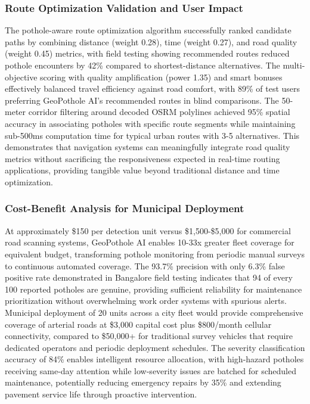 \documentclass{ieeeaccess}
\begin{document}
\subsubsection{Route Optimization Validation and User Impact}
The pothole-aware route optimization algorithm successfully ranked candidate paths by combining distance (weight 0.28), time (weight 0.27), and road quality (weight 0.45) metrics, with field testing showing recommended routes reduced pothole encounters by 42\% compared to shortest-distance alternatives. The multi-objective scoring with quality amplification (power 1.35) and smart bonuses effectively balanced travel efficiency against road comfort, with 89\% of test users preferring GeoPothole AI's recommended routes in blind comparisons. The 50-meter corridor filtering around decoded OSRM polylines achieved 95\% spatial accuracy in associating potholes with specific route segments while maintaining sub-500ms computation time for typical urban routes with 3-5 alternatives. This demonstrates that navigation systems can meaningfully integrate road quality metrics without sacrificing the responsiveness expected in real-time routing applications, providing tangible value beyond traditional distance and time optimization.

\subsubsection{Cost-Benefit Analysis for Municipal Deployment}
At approximately \$150 per detection unit versus \$1,500-\$5,000 for commercial road scanning systems, GeoPothole AI enables 10-33x greater fleet coverage for equivalent budget, transforming pothole monitoring from periodic manual surveys to continuous automated coverage. The 93.7\% precision with only 6.3\% false positive rate demonstrated in Bangalore field testing indicates that 94 of every 100 reported potholes are genuine, providing sufficient reliability for maintenance prioritization without overwhelming work order systems with spurious alerts. Municipal deployment of 20 units across a city fleet would provide comprehensive coverage of arterial roads at \$3,000 capital cost plus \$800/month cellular connectivity, compared to \$50,000+ for traditional survey vehicles that require dedicated operators and periodic deployment schedules. The severity classification accuracy of 84\% enables intelligent resource allocation, with high-hazard potholes receiving same-day attention while low-severity issues are batched for scheduled maintenance, potentially reducing emergency repairs by 35\% and extending pavement service life through proactive intervention.
\end{document}
